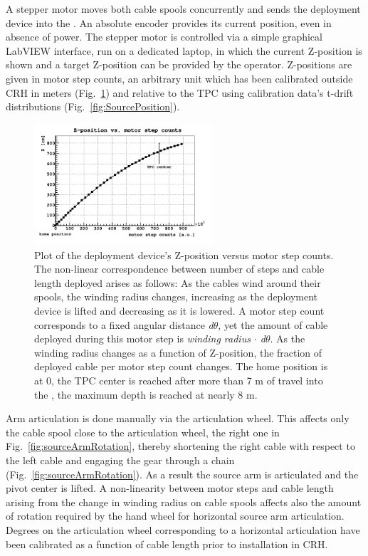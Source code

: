 A stepper motor moves both cable spools concurrently and sends the deployment device into the \lsv. An absolute encoder provides its current position, even in absence of power. The stepper motor is controlled via a simple graphical LabVIEW interface, run on a dedicated laptop, in which the current Z-position is shown and a target Z-position can be provided by the operator. Z-positions are given in motor step counts, an arbitrary unit which has been calibrated outside CRH in meters (Fig.~\ref{fig:z_test}) and relative to the TPC using calibration data's t-drift distributions (Fig.~\ref{fig:SourcePosition}).

\begin{figure}[htbp]
 \centering
 \includegraphics[width=0.59\textwidth]{Figures/MSC_Z}
 \caption{Plot of the deployment device's Z-position versus motor step counts. The non-linear correspondence between number of steps and cable length deployed arises as follows: As the cables wind around their spools, the winding radius changes, increasing as the deployment device is lifted and decreasing as it is lowered. A motor step count corresponds to a fixed angular distance \textit{d$\theta$}, yet the amount of cable deployed during this motor step is \textit{winding radius $\cdot$ d$\theta$}. As the winding radius changes as a function of Z-position, the fraction of deployed cable per motor step count changes. The home position is at 0, the TPC center is reached after more than 7 m of travel into the \lsv, the maximum depth is reached at nearly 8 m.}
 \label{fig:z_test}
\end{figure}

\label{sec:Nonlinearity:MotorStepCounts}
Arm articulation is done manually via the articulation wheel. This affects only the cable spool close to the articulation wheel, the right one in Fig.~\ref{fig:sourceArmRotation}, thereby shortening the right cable with respect to the left cable and engaging the gear through a chain (Fig.~\ref{fig:sourceArmRotation}). As a result the source arm is articulated and the pivot center is lifted. A non-linearity between motor steps and cable length arising from the change in winding radius on cable spools affects also the amount of rotation required by the hand wheel for horizontal source arm articulation.
Degrees on the articulation wheel corresponding to a horizontal articulation have been calibrated as a function of cable length prior to installation in CRH.

